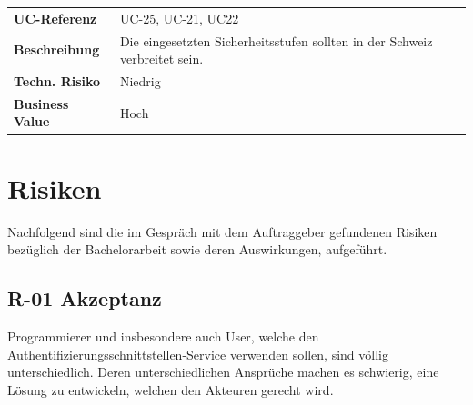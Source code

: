 \begin{longtable}[c]{@{}ll@{}}
\toprule
\begin{minipage}[t]{0.20\columnwidth}\raggedright\strut
\textbf{UC-Referenz}
\strut\end{minipage} &
\begin{minipage}[t]{0.74\columnwidth}\raggedright\strut
UC-25, UC-21, UC22
\strut\end{minipage}\tabularnewline
\begin{minipage}[t]{0.20\columnwidth}\raggedright\strut
\textbf{Beschreibung}
\strut\end{minipage} &
\begin{minipage}[t]{0.74\columnwidth}\raggedright\strut
Die eingesetzten Sicherheitsstufen sollten in der Schweiz verbreitet
sein.
\strut\end{minipage}\tabularnewline
\begin{minipage}[t]{0.20\columnwidth}\raggedright\strut
\textbf{Techn. Risiko}
\strut\end{minipage} &
\begin{minipage}[t]{0.74\columnwidth}\raggedright\strut
Niedrig
\strut\end{minipage}\tabularnewline
\begin{minipage}[t]{0.20\columnwidth}\raggedright\strut
\textbf{Business Value}
\strut\end{minipage} &
\begin{minipage}[t]{0.74\columnwidth}\raggedright\strut
Hoch
\strut\end{minipage}\tabularnewline
\bottomrule
\end{longtable}

\newpage

\newpage

\section{Risiken}\label{risiken}

Nachfolgend sind die im Gespräch mit dem Auftraggeber gefundenen Risiken
bezüglich der Bachelorarbeit sowie deren Auswirkungen, aufgeführt.

\subsection{R-01 Akzeptanz}\label{r-01-akzeptanz}

Programmierer und insbesondere auch User, welche den
Authentifizierungsschnittstellen-Service verwenden sollen, sind völlig
unterschiedlich. Deren unterschiedlichen Ansprüche machen es schwierig,
eine Lösung zu entwickeln, welchen den Akteuren gerecht wird.


